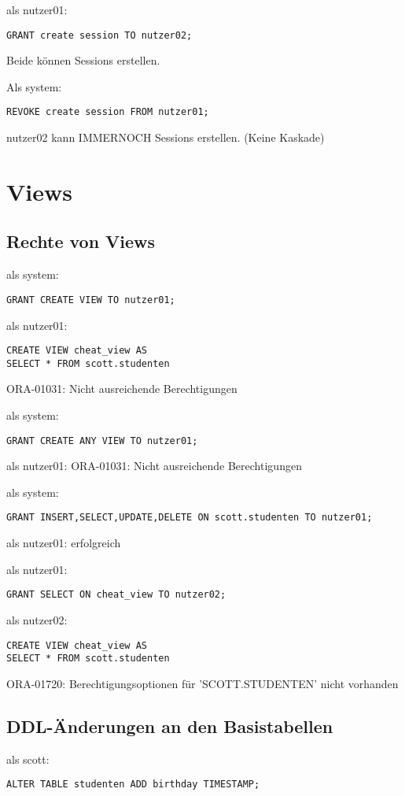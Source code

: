 \documentclass[10pt]{scrreprt}
\begin{document}
als nutzer01:
\begin{lstlisting}[style=sql]
GRANT create session TO nutzer02;
\end{lstlisting}
Beide können Sessions erstellen.

Als system:
\begin{lstlisting}[style=sql]
REVOKE create session FROM nutzer01;
\end{lstlisting}
nutzer02 kann IMMERNOCH Sessions erstellen. (Keine Kaskade)

\section{Views}
\subsection{Rechte von Views}
als system:
\begin{lstlisting}[style=sql]
GRANT CREATE VIEW TO nutzer01;
\end{lstlisting}

als nutzer01:
\begin{lstlisting}[style=sql]
CREATE VIEW cheat_view AS
SELECT * FROM scott.studenten
\end{lstlisting}
ORA-01031: Nicht ausreichende Berechtigungen

als system:
\begin{lstlisting}[style=sql]
GRANT CREATE ANY VIEW TO nutzer01;
\end{lstlisting}

als nutzer01:
ORA-01031: Nicht ausreichende Berechtigungen

als system:
\begin{lstlisting}[style=sql]
GRANT INSERT,SELECT,UPDATE,DELETE ON scott.studenten TO nutzer01;
\end{lstlisting}

als nutzer01:
erfolgreich

als nutzer01:
\begin{lstlisting}[style=sql]
GRANT SELECT ON cheat_view TO nutzer02;
\end{lstlisting}

als nutzer02:
\begin{lstlisting}[style=sql]
CREATE VIEW cheat_view AS
SELECT * FROM scott.studenten
\end{lstlisting}
ORA-01720: Berechtigungsoptionen für 'SCOTT.STUDENTEN' nicht vorhanden

\subsection{DDL-Änderungen an den Basistabellen}
als scott:
\begin{lstlisting}[style=sql]
ALTER TABLE studenten ADD birthday TIMESTAMP;
\end{lstlisting}
\end{document}
